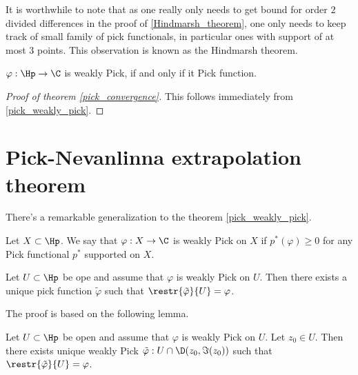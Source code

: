 It is worthwhile to note that as one really only needs to get bound for order $2$ divided differences in the proof of \ref{Hindmarsh_theorem}, one only needs to keep track of small family of pick functionals, in particular ones with support of at most $3$ points. This observation is known as the Hindmarsh theorem.

\begin{kor}\label{pick_weakly_pick}
	$\varphi : \Hp \to \C$ is weakly Pick, if and only if it Pick function.
\end{kor}

\begin{proof}[Proof of theorem \ref{pick_convergence}]
	This follows immediately from \ref{pick_weakly_pick}.
\end{proof}

\section{Pick-Nevanlinna extrapolation theorem}

There's a remarkable generalization to the theorem \ref{pick_weakly_pick}.

\begin{maar}
	Let $X \subset \Hp$. We say that $\varphi : X \to \C$ is weakly Pick on $X$ if $p^{*}(\varphi) \geq 0$ for any Pick functional $p^{*}$ supported on $X$.
\end{maar}

\begin{lause}\label{open_pick_interpolation}
	Let $U \subset \Hp$ be ope and assume that $\varphi$ is weakly Pick on $U$. Then there exists a unique pick function $\tilde{\varphi}$ such that $\restr{\tilde{\varphi}}{U} = \varphi$.
\end{lause}

The proof is based on the following lemma.

\begin{lem}\label{open_pick_lemma}
	Let $U \subset \Hp$ be open and assume that $\varphi$ is weakly Pick on $U$. Let $z_{0} \in U$. Then there exists unique weakly Pick $\tilde{\varphi} : U \cap \D(z_{0}, \Im(z_{0}))$ such that $\restr{\tilde{\varphi}}{U} = \varphi$.
\end{lem}

